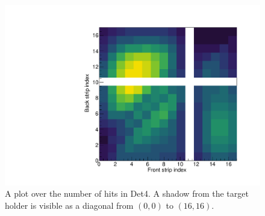 \begin{figure}[h]
	\centering
	\includegraphics[width=.7\linewidth]{../figures/mexihatDet4.pdf}
	\caption{A plot over the number of hits in Det4. A shadow from the target holder is visible as a diagonal from $(0,0)$ to $(16,16)$.}
	\label{fig:mexihatDet4}
\end{figure}


